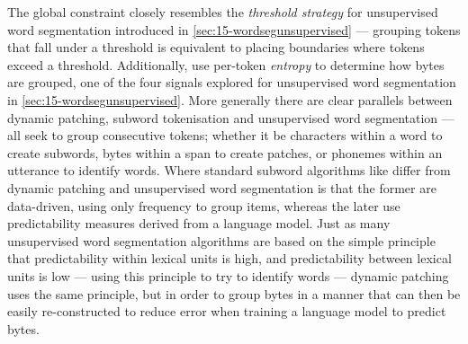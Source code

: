The global constraint closely resembles the \emph{threshold strategy} for unsupervised word segmentation introduced in \cref{sec:15-wordsegunsupervised} --- grouping tokens that fall under a threshold is equivalent to placing boundaries where tokens exceed a threshold. Additionally, \citet{pagnoni2024byte} use per-token \emph{entropy} to determine how bytes are grouped, one of the four signals explored for unsupervised word segmentation in \cref{sec:15-wordsegunsupervised}. More generally there are clear parallels between dynamic patching, subword tokenisation and unsupervised word segmentation --- all seek to group consecutive tokens; whether it be characters within a word to create subwords, bytes within a span to create patches, or phonemes within an utterance to identify words. Where standard subword algorithms like \bpe differ from dynamic patching and unsupervised word segmentation is that the former are data-driven, using only frequency to group items, whereas the later use predictability measures derived from a language model. Just as many unsupervised word segmentation algorithms are based on the simple principle that predictability within lexical units is high, and predictability between lexical units is low \citep{harris1955} --- using this principle to try to identify words --- dynamic patching uses the same principle, but in order to group bytes in a manner that can then be easily re-constructed to reduce error when training a language model to predict bytes. 



